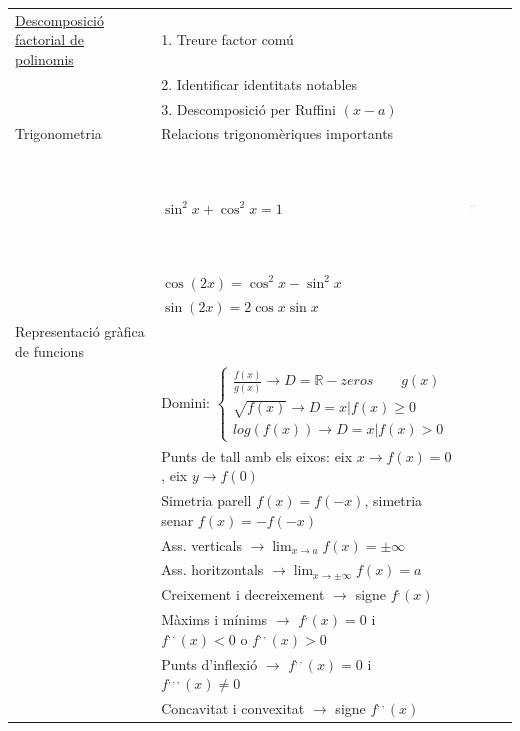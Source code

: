 \documentclass{article}
\begin{document}
\begin{center}
\begin{longtable}{ | l |l|l|}
            \hline

    \href{http://proyectodescartes.org/EDAD/materiales_didacticos/EDAD_4eso_cat_polinomios-JS-LOMCE/index.htm}{Descomposició factorial de polinomis}& 1. Treure factor comú & \\
    & 2. Identificar identitats notables & \\
    & 3. Descomposició per Ruffini $(x-a)$ & \\
    \hline
    Trigonometria & Relacions trigonomèriques importants& \\
    & $\sin^2 x + \cos^2 x=1  $& \includegraphics[width=0.2\textwidth, height=30mm]{circumf_unitat.png}\\
    & $\cos(2x) =\cos^2 x-\sin^2 x$& \\
    & $\sin(2x)=2\cos x \sin x$& \\
    \hline
    Representació gràfica de funcions & & \\
    & Domini: $\begin{cases} \frac{f(x)}{g(x)}\rightarrow D=\mathbb{R}-zeros\qquad g(x)\\ \sqrt{f(x)}\rightarrow D=x | f(x) \ge 0\\ log(f(x)) \rightarrow D=x | f(x) > 0 \end{cases}$ & \\
    & Punts de tall amb els eixos: eix $x\rightarrow f(x)=0$, eix $y\rightarrow f(0)$& \\
    & Simetria parell $f(x)=f(-x)$, simetria senar $f(x)=-f(-x)$& \\
    & Ass. verticals $\rightarrow \lim_{x\to a }f(x)=\pm \infty$& \\
    & Ass. horitzontals $\rightarrow \lim_{x\to \pm \infty }f(x)=a$& \\
    & Creixement i decreixement $\rightarrow$ signe $f^{,}(x)$&\\
    & Màxims i mínims $\rightarrow$ $f^{,}(x)=0$ i $f^{,,}(x)<0$ o $f^{,,}(x)>0$&\\
    & Punts d'inflexió $\rightarrow$ $f^{,,}(x)=0$ i $f^{,,,}(x)\neq 0$&\\
    & Concavitat i convexitat $\rightarrow$ signe $f^{,,}(x)$&\\
        \hline

\end{longtable}
\end{center}
\end{document}
